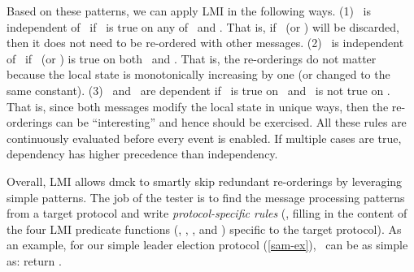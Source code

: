 Based on these patterns, we can  apply LMI in the following
ways.
%
(1) \mx\ is independent of \my\ if \pd\ is true on any of \mx\ and \my.
That is, if \mx\ (or \my) will be discarded, 
then it does not need to be re-ordered 
with other messages.
%
(2) \mx\ is independent of \my\ if \pi\ (or \pc) is true on both \mx\ and \my.
That is, the re-orderings do not matter because the local state is
monotonically increasing by one (or changed to the same constant).
%
(3) \mx\ and \my\ are dependent if \pm\ is true on \mx\ and 
\pd\ is not true on \my.  
That is, since both messages modify the local state in unique ways, then the
re-orderings can be ``interesting'' and hence should be exercised.
%
All these rules are continuously evaluated before every event is
enabled.  If multiple cases are true, dependency has higher precedence
than independency.







Overall, LMI allows dmck to smartly skip redundant re-orderings by
leveraging simple patterns.  The job of the tester is to find the
message processing patterns from a target protocol and write {\em
protocol-specific rules} (\ie, filling in the content of the four LMI
predicate functions (\pd, \pi, \pc, and \pm) specific to the target
protocol).  As an example, for our simple leader election protocol
(\sec\ref{sam-ex}), \pd\ can be as simple as:
return  \ts{<}
.


